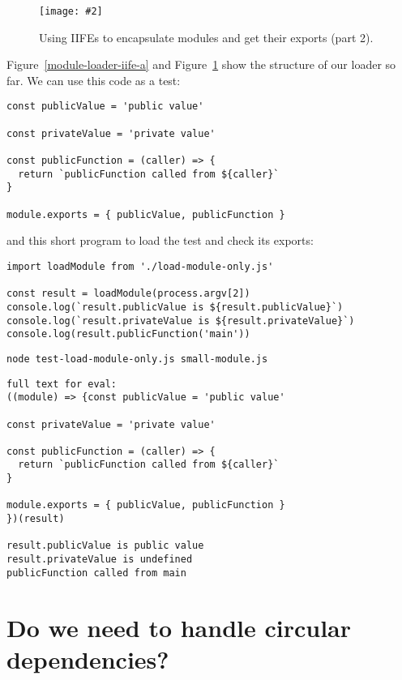 \documentclass[krantzl]{krantz}
\newcommand{\figpdf}[4]{\begin{figure}%
\centering%
\texttt{[image: \#2]}%
\caption{#3}%
\label{#1}%
\end{figure}}
\newcommand{\figref}[1]{Figure~\ref{#1}}
\begin{document}
\figpdf{module-loader-iife-b}{./module-loader/iife-b.pdf}{Using IIFEs to encapsulate modules and get their exports (part 2).}{0.6}


\figref{module-loader-iife-a} and \figref{module-loader-iife-b} show the structure of our loader so far.
We can use this code as a test:


\begin{lstlisting}[frame=single,frameround=tttt]
const publicValue = 'public value'

const privateValue = 'private value'

const publicFunction = (caller) => {
  return `publicFunction called from ${caller}`
}

module.exports = { publicValue, publicFunction }
\end{lstlisting}



\noindent and this short program to load the test and check its exports:


\begin{lstlisting}[frame=single,frameround=tttt]
import loadModule from './load-module-only.js'

const result = loadModule(process.argv[2])
console.log(`result.publicValue is ${result.publicValue}`)
console.log(`result.privateValue is ${result.privateValue}`)
console.log(result.publicFunction('main'))
\end{lstlisting}



\begin{lstlisting}[frame=single,frameround=tttt]
node test-load-module-only.js small-module.js
\end{lstlisting}



\begin{lstlisting}[frame=single,frameround=tttt]
full text for eval:
((module) => {const publicValue = 'public value'

const privateValue = 'private value'

const publicFunction = (caller) => {
  return `publicFunction called from ${caller}`
}

module.exports = { publicValue, publicFunction }
})(result)

result.publicValue is public value
result.privateValue is undefined
publicFunction called from main
\end{lstlisting}


\section{Do we need to handle circular dependencies?}\label{module-loader-circular}
\end{document}
